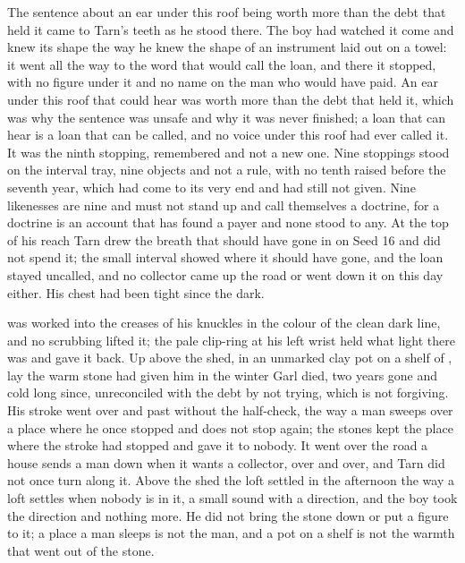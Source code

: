The sentence about an ear under this roof being worth more than the debt that held it came to Tarn's teeth as he stood there. The boy had watched it come and knew its shape the way he knew the shape of an instrument laid out on a towel: it went all the way to the word that would call the loan, and there it stopped, with no figure under it and no name on the man who would have paid. An ear under this roof that could hear was worth more than the debt that held it, which was why the sentence was unsafe and why it was never finished; a loan that can hear is a loan that can be called, and no voice under this roof had ever called it. It was the ninth stopping, remembered and not a new one. Nine stoppings stood on the interval tray, nine objects and not a rule, with no tenth raised before the seventh year, which had come to its very end and had still not given. Nine likenesses are nine and must not stand up and call themselves a doctrine, for a doctrine is an account that has found a payer and none stood to any. At the top of his reach Tarn drew the breath that should have gone in on Seed 16 and did not spend it; the small interval showed where it should have gone, and the loan stayed uncalled, and no collector came up the road or went down it on this day either. His chest had been tight since the dark.

 was worked into the creases of his knuckles in the colour of the clean dark line, and no scrubbing lifted it; the pale clip-ring at his left wrist held what light there was and gave it back. Up above the shed, in an unmarked clay pot on a shelf of , lay the warm stone  had given him in the winter Garl died, two years gone and cold long since, unreconciled with the debt by not trying, which is not forgiving. His stroke went over  and past  without the half-check, the way a man sweeps over a place where he once stopped and does not stop again; the stones kept the place where the stroke had stopped and gave it to nobody. It went over the road a house sends a man down when it wants a collector, over and over, and Tarn did not once turn along it. Above the shed the loft settled in the afternoon the way a loft settles when nobody is in it, a small sound with a direction, and the boy took the direction and nothing more. He did not bring the stone down or put a figure to it; a place a man sleeps is not the man, and a pot on a shelf is not the warmth that went out of the stone.

\scenebreak

